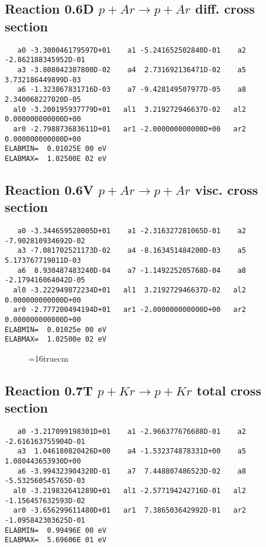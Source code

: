 \documentclass[12pt]{article}
\begin{document}
\subsection{
Reaction 0.6D    $p + Ar \rightarrow p + Ar  $ diff. cross
section }


\begin{small}\begin{verbatim}
   a0 -3.300046179597D+01    a1 -5.241652502840D-01    a2 -2.862188345952D-01
   a3 -3.808042387800D-02    a4  2.731692136471D-02    a5  3.732186449899D-03
   a6 -1.323867831716D-03    a7 -9.428149507977D-05    a8  2.340068227020D-05
  al0 -3.200195937779D+01   al1  3.219272946637D-02   al2  0.000000000000D+00
  ar0 -2.798873683611D+01   ar1 -2.000000000000D+00   ar2  0.000000000000D+00
ELABMIN=  0.01025E 00 eV
ELABMAX=  1.02500E 02 eV
\end{verbatim}\end{small}

\subsection{
Reaction 0.6V   $ p + Ar \rightarrow p + Ar  $ visc. cross
section }


\begin{small}\begin{verbatim}
   a0 -3.344659528005D+01    a1 -2.316327281065D-01    a2 -7.902810934692D-02
   a3 -7.081702521173D-02    a4 -8.163451484200D-03    a5  5.173767719011D-03
   a6  8.930487483240D-04    a7 -1.149225205768D-04    a8 -2.179416064042D-05
  al0 -3.222949872234D+01   al1  3.219272946637D-02   al2  0.000000000000D+00
  ar0 -2.777200494194D+01   ar1 -2.000000000000D+00   ar2  0.000000000000D+00
ELABMIN=  0.01025e 00 eV
ELABMAX=  1.02500e 02 eV
\end{verbatim}\end{small}



\begin{figure} \label{0.6}
\epsfxsize=16truecm
\end{figure}
\newpage



\subsection{
Reaction 0.7T   $ p + Kr \rightarrow p + Kr $ total cross
section }



\begin{small}\begin{verbatim}
   a0 -3.217099198301D+01    a1 -2.966377676688D-01    a2 -2.616163755904D-01
   a3  1.046180820426D+00    a4 -1.532374878331D+00    a5  1.080443653930D+00
   a6 -3.994323904320D-01    a7  7.448807486523D-02    a8 -5.532560545765D-03
  al0 -3.219832641289D+01   al1 -2.577194242716D-01   al2 -1.156457632593D-02
  ar0 -3.656299611480D+01   ar1  7.386503642992D-01   ar2 -1.095842303625D-01
ELABMIN=  0.99496E 00 eV
ELABMAX=  5.69606E 01 eV
\end{verbatim}\end{small}
\end{document}
